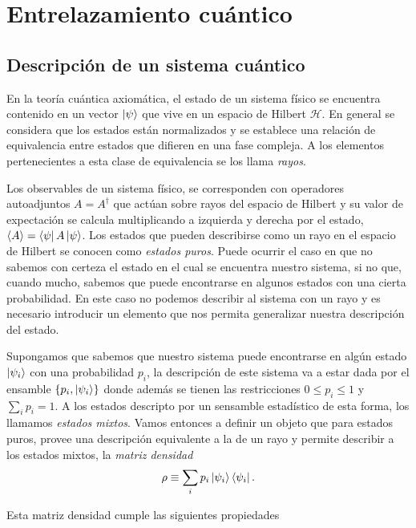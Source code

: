 \documentclass[../main.tex]{subfiles}
\begin{document}
\setcounter{chapter}{1}
\chapter{Entrelazamiento cuántico}

\section{Descripción de un sistema cuántico}

En la teoría cuántica axiomática, el estado de un sistema físico se encuentra contenido en un vector $\left | \psi \right \rangle$ que vive en un espacio de Hilbert $\mathcal H$. En general se considera que los estados están normalizados y se establece una relación de equivalencia entre estados que difieren en una fase compleja. A los elementos pertenecientes a esta clase de equivalencia se los llama \textit{rayos}.

Los observables de un sistema físico, se corresponden con operadores autoadjuntos $A = A^\dagger$ que actúan sobre rayos del espacio de Hilbert y su valor de expectación se calcula multiplicando a izquierda y derecha por el estado, $\langle A \rangle = \left \langle \psi \right | A \left | \psi \right \rangle$. Los estados que pueden describirse como un rayo en el espacio de Hilbert se conocen como \textit{estados puros}. Puede ocurrir el caso en que no sabemos con certeza el estado en el cual se encuentra nuestro sistema, si no que, cuando mucho, sabemos que puede encontrarse en algunos estados con una cierta probabilidad. En este caso no podemos describir al sistema con un rayo y es necesario introducir un elemento que nos permita generalizar nuestra descripción del estado.

Supongamos que sabemos que nuestro sistema puede encontrarse en algún estado $\left | \psi_i \right \rangle$ con una probabilidad $p_i$, la descripción de este sistema va a estar dada por el ensamble $\left \{ p_i, \left | \psi_i \right \rangle \right \}$ donde además se tienen las restricciones $0 \leq p_i \leq 1$ y $\sum_i p_i = 1$. A los estados descripto por un sensamble estadístico de esta forma,  los llamamos \textit{estados mixtos}. Vamos entonces a definir un objeto que para estados puros, provee una descripción equivalente a la de un rayo y permite describir a los estados mixtos, la \textit{matriz densidad}
\begin{align}
	\rho \equiv \sum_i p_i \left | \psi_i \right \rangle \left \langle \psi_i \right |.
\end{align}

Esta matriz densidad cumple las siguientes propiedades
\end{document}
